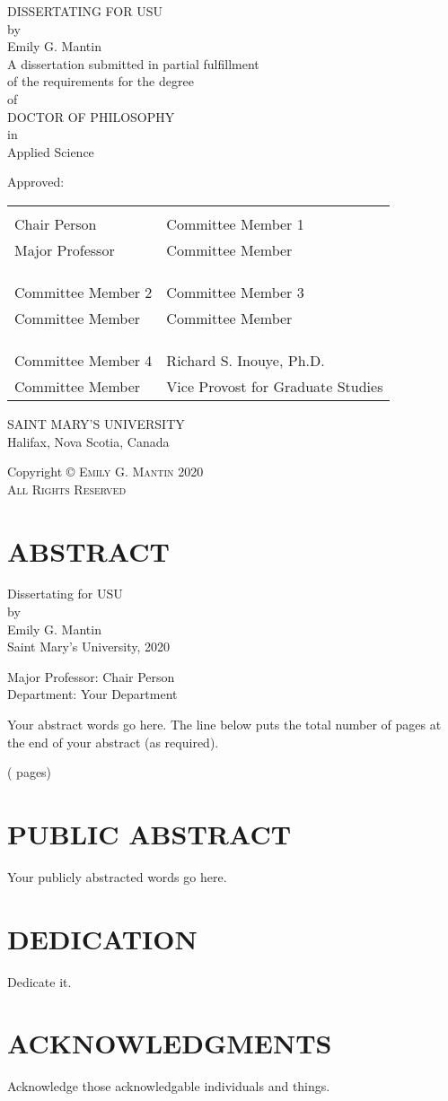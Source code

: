 \documentclass{DissertateUSU}
\renewcommand{\maketitle}{
	\thispagestyle{empty}
	\vspace*{\fill}
	\begin{center}
	\doublespaced
	\MakeUppercase{Dissertating for USU}\\
	by\\
	Emily G. Mantin \\
	\singlespaced
	A dissertation submitted in partial fulfillment\\
	of the requirements for the degree \\
	\doublespaced
	of\\
	\MakeUppercase{Doctor of Philosophy} \\
	in\\
	\singlespaced
  Applied Science \\
	\end{center}

	\vspace{20pt}
	\noindent Approved: \\
	\vspace{30pt}
	\noindent
	\begin{tabular}{ll}
    \makebox[2.75in]{\hrulefill} & \makebox[2.75in]{\hrulefill}\\
    Chair Person                      & Committee Member 1 \\
    Major Professor              & Committee Member \\
    & \\
    & \\
    \makebox[2.75in]{\hrulefill} & \makebox[2.75in]{\hrulefill}\\
    Committee Member 2                 & Committee Member 3 \\
    Committee Member             & Committee Member \\
    & \\
    & \\
    \makebox[2.75in]{\hrulefill} & \makebox[2.75in]{\hrulefill}\\
    Committee Member 4                 & Richard S. Inouye, Ph.D. \\
    Committee Member             & Vice Provost for Graduate Studies \\

    \end{tabular}

  \vspace{20pt}
    \begin{center}
	  \singlespacing
      \MakeUppercase{Saint Mary's University}\\
	    Halifax, Nova Scotia, Canada\\
	    \doublespacing
	    2020
	  \end{center}
	\vspace*{\fill}
	\clearpage
}
\newcommand{\abstracttitle}{

  \doublespacing
  \begin{center}
  Dissertating for USU \\
  \vspace{12pt}
  by \\
  \vspace{12pt}
  Emily G. Mantin \\
  Saint Mary's University, 2020
  \end{center}

  \vspace{12pt}

  \singlespacing
  \noindent Major Professor: Chair Person \\
  \noindent Department: Your Department

  \vspace{12pt}
}
\newcommand{\copyrightpage}{
	\vspace*{\fill}
  \begin{center}
	\doublespacing
	Copyright \hspace{3pt}
	  \scshape \small \copyright  \hspace{3pt}
	  Emily G. Mantin \hspace{3pt} 2020 \\
	All Rights Reserved
  \end{center}
	\vspace*{\fill}
}
\begin{document}
\maketitle

\pagestyle{empty}
\copyrightpage


\newpage

\pagestyle{plain} \fancyhead[R]{\thepage} \fancyfoot[C]{}
\chapter*{ABSTRACT} 

\abstracttitle
\doublespacing

Your abstract words go here. The line below puts the total number of
pages at the end of your abstract (as required).

\begin{flushright}(\pageref{LastPage} pages)\end{flushright}

\newpage

\fancyhead[R]{\thepage} \fancyfoot[C]{} \chapter*{PUBLIC ABSTRACT}
 \doublespacing

Your publicly abstracted words go here.

\newpage

\fancyhead[R]{\thepage} \fancyfoot[C]{} \chapter*{DEDICATION}

Dedicate it.

\newpage

\fancyhead[R]{\thepage} \fancyfoot[C]{} \chapter*{ACKNOWLEDGMENTS}

Acknowledge those acknowledgable individuals and things.

\newpage

\fancyhead[R]{\thepage} \fancyfoot[C]{} \tableofcontents

\newpage
\end{document}
